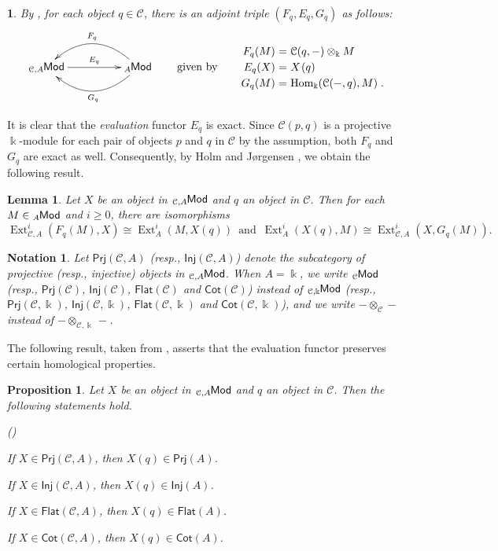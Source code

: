\documentclass{amsart}
\theoremstyle{bfupright head,slanted body}
\theoremstyle{bfupright head,upright body}
\theoremstyle{fixed bf head,slanted body}
\newtheorem{prp}[res]{Proposition}      \newtheorem*{prp*}{Proposition}
\newtheorem{lem}[res]{Lemma}            \newtheorem*{lem*}{Lemma}
\theoremstyle{fixed bf head,upright body}
\newtheorem{nota}[res]{Notation}           \newtheorem*{nota*}{Notation}
\theoremstyle{numbered paragraph}
\newtheorem{ipg}[res]{}
\newlength{\thmlistleft}        %
\newlength{\thmlistright}       %
\newlength{\thmlistpartopsep}   %
\newlength{\thmlisttopsep}      %
\newlength{\thmlistparsep}      %
\newlength{\thmlistitemsep}     %
\newcounter{prt}
\newenvironment{prt}{\begin{list}{\upshape (\alph{prt})}%
		{\usecounter{prt}%
			\setlength{\leftmargin}{\thmlistleft}%
			\setlength{\labelwidth}{\thmlistleft}%
			\setlength{\rightmargin}{\thmlistright}%
			\setlength{\partopsep}{\thmlistpartopsep}%
			\setlength{\topsep}{\thmlisttopsep}%
			\setlength{\parsep}{\thmlistparsep}%
			\setlength{\itemsep}{\thmlistitemsep}}}%
	{\end{list}}%
\numberwithin{equation}{res}
\newcommand{\Flat}[1]{\mathsf{Flat}(#1)}
\newcommand{\Cot}[1]{\mathsf{Cot}(#1)}
\newcommand{\Prj}[1]{\mathsf{Prj}(#1)}
\newcommand{\Inj}[1]{\mathsf{Inj}(#1)}
\newcommand{\Hom}[3][]{\operatorname{Hom}_{#1}(#2,#3)}
\newcommand{\Ext}[4][]{\operatorname{Ext}_{#1}^{#2}(#3,#4)}
\newcommand{\C}{\mathcal{C}}
\newcommand{\kk}{\Bbbk}
\newcommand{\is}{\cong}
\newcommand{\lMod}[1]{{}_{#1}\mspace{-1mu}{\sf{Mod}}}
\begin{document}
\begin{ipg}\label{adjoint triple}
By \cite[Corollary 3.9]{HJ21}, for each object $q \in \C$, there is an adjoint triple $(F_{q},E_{q},G_{q})$ as follows:
  \begin{equation*}
  \xymatrix@C=4pc{
      \lMod{\C,A}
    \ar[r]^-{E_{q}}
    & \lMod{A}
    \ar@/_1.8pc/[l]_-{F_{q}}
    \ar@/^1.8pc/[l]^-{G_{q}}
  }
  \qquad \text{given by} \qquad
  {\setlength\arraycolsep{1.5pt}
   \renewcommand{\arraystretch}{1.2}
  \begin{array}{rcl}
  F_q(M) &=& \C(q,-) \otimes_\kk M \\
  E_q(X) &=& X\mspace{1.5mu}(q) \\
  G_{q}(M) &=& \Hom[\kk]{\C(-, q)}{M}\;.
  \end{array}
  }
  \end{equation*}
\end{ipg}

It is clear that the \textit{evaluation} functor $E_q$ is exact. Since $\C(p,q)$ is a projective $\kk$-module for each pair of objects $p$ and $q$ in $\C$ by the assumption, both $F_q$ and $G_q$ are exact as well. Consequently, by Holm and J{\o}rgensen \cite[Lemma 5.1]{HJ19}, we obtain the following result.

\begin{lem}\label{n-iso}
Let $X$ be an object in $\lMod{\C,A}$ and $q$ an object in $\C$. Then for each $M \in \lMod{A}$ and $i \geqslant 0$, there are isomorphisms
\[
\Ext[\C,A]{i}{F_q(M)}{X} \is \Ext[A]{i}{M}{X(q)}
\,\text{  and  }\,
\Ext[A]{i}{X(q)}{M} \is \Ext[\C,A]{i}{X}{G_q(M)}.
\]
\end{lem}

\begin{nota}
Let $\Prj{\C,A}$ (resp., $\Inj{\C,A}$) denote the subcategory of projective (resp., injective) objects in $\lMod{\C,A}$. When $A=\kk$, we write $\lMod{\C}$ (resp., $\Prj{\C}$, $\Inj{\C}$, $\Flat{\C}$ and $\Cot{\C}$) instead of $\lMod{\C,\kk}$ (resp., $\Prj{\C,\kk}$, $\Inj{\C,\kk}$, $\Flat{\C,\kk}$ and $\Cot{\C,\kk}$), and we write $-\otimes_{\C}-$ instead of $-\otimes_{\C,\kk}-$.
\end{nota}

The following result, taken from \cite[Proposition 1.10]{DLLM}, asserts that the evaluation functor preserves certain homological properties.

\begin{prp}\label{degreewise}
Let $X$ be an object in $\lMod{\C,A}$ and $q$ an object in $\C$. Then the following statements hold.
\begin{prt}
\item If $X\in\Prj{\C,A}$, then $X(q)\in\Prj{A}$.
\item If $X\in\Inj{\C,A}$, then $X(q)\in\Inj{A}$.
\item If $X\in\Flat{\C,A}$, then $X(q)\in\Flat{A}$.
\item If $X\in\Cot{\C,A}$, then $X(q)\in\Cot{A}$.
\end{prt}
\end{prp}
\end{document}
